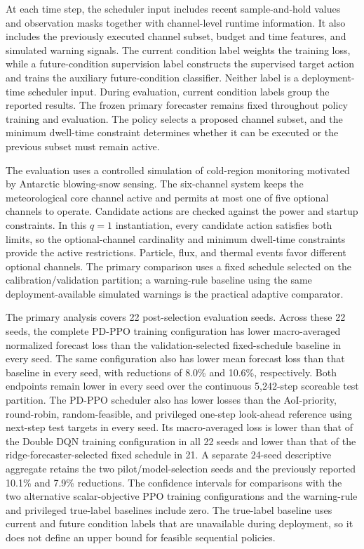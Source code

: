 At each time step, the scheduler input includes recent sample-and-hold values
and observation masks together with channel-level runtime information. It also
includes the previously executed channel subset, budget and time features, and
simulated warning signals. The current condition label weights the training loss,
while a future-condition supervision label constructs the supervised target
action and trains the auxiliary future-condition classifier. Neither label is a
deployment-time scheduler input. During evaluation, current condition labels group the
reported results. The frozen primary forecaster remains fixed throughout policy
training and evaluation. The policy
selects a proposed channel subset, and the minimum dwell-time constraint
determines whether it can be executed or the previous subset must remain active.

The evaluation uses a controlled simulation of cold-region monitoring motivated
by Antarctic blowing-snow sensing. The six-channel system keeps the meteorological core
channel active and permits at most one of five optional channels to operate.
Candidate actions are checked against the power and startup constraints. In this
$q=1$ instantiation, every candidate action satisfies both limits, so the
optional-channel cardinality and minimum dwell-time constraints provide the active
restrictions. Particle, flux,
and thermal events favor different optional channels. The primary comparison uses
a fixed schedule selected on the calibration/validation partition; a warning-rule baseline
using the same deployment-available simulated warnings is the practical adaptive
comparator.

The primary analysis covers 22 post-selection evaluation seeds. Across these 22
seeds, the complete PD-PPO training configuration has lower macro-averaged
normalized forecast loss than the validation-selected fixed-schedule baseline in
every seed. The same configuration also has lower mean forecast loss than that
baseline in every seed, with reductions of 8.0\% and 10.6\%, respectively. Both
endpoints remain lower in every seed over the continuous 5,242-step scoreable test
partition. The PD-PPO scheduler also has lower losses than the AoI-priority,
round-robin, random-feasible, and privileged one-step look-ahead reference using
next-step test targets in every seed. Its macro-averaged loss is lower than that of
the Double DQN training configuration in all 22 seeds and lower than that of the
ridge-forecaster-selected fixed schedule in 21. A separate 24-seed descriptive aggregate retains
the two pilot/model-selection seeds and the previously reported 10.1\% and 7.9\%
reductions. The confidence intervals for comparisons with the two alternative
scalar-objective PPO training configurations and the warning-rule and privileged true-label baselines
include zero. The
true-label baseline uses current and future condition labels that are unavailable
during deployment, so it does not define an upper bound for feasible sequential
policies.

